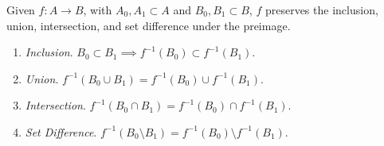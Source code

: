 \documentclass{article}
\begin{document}
    \begin{theorem}
      Given $f: A \rightarrow B$, with $A_0, A_1 \subset A$ and $B_0, B_1 \subset B$, $f$ preserves the inclusion, union, intersection, and set difference under the preimage. 
      \begin{enumerate}
        \item \textit{Inclusion}. $B_0 \subset B_1 \implies f^{-1} (B_0) \subset f^{-1} (B_1)$. 
        \item \textit{Union}. $f^{-1} (B_0 \cup B_1) = f^{-1} (B_0) \cup f^{-1} (B_1)$. 
        \item \textit{Intersection}. $f^{-1} (B_0 \cap B_1) = f^{-1} (B_0) \cap f^{-1} (B_1)$. 
        \item \textit{Set Difference}. $f^{-1}(B_0 \setminus B_1) = f^{-1} (B_0) \setminus f^{-1} (B_1)$. 
      \end{enumerate}
    \end{theorem} 
\end{document}
